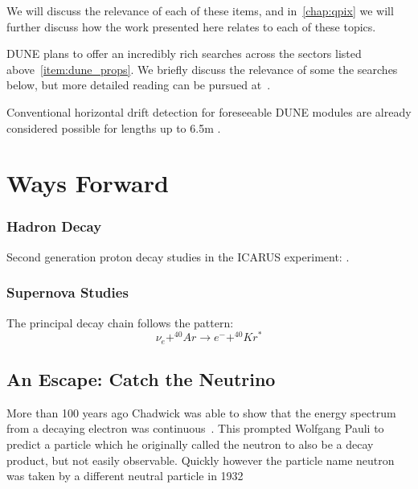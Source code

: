 We will discuss the relevance of each of these items, and in~\ref{chap:qpix} we will further discuss how the work presented here relates to each of these topics.

DUNE plans to offer an incredibly rich searches across the sectors listed above~\ref{item:dune_props}.
We briefly discuss the relevance of some the searches below, but more detailed reading can be pursued at~\citep{DUNE_FD_TDRv2_2020}.

Conventional horizontal drift detection for foreseeable DUNE modules are already considered possible for lengths up to 6.5m \citep{DUNE_Vertical:Paulucci_2022}.


\section{Ways Forward}

\subsubsection{Hadron Decay}
\label{sect:intro_decay}

Second generation proton decay studies in the ICARUS experiment: \citep{ICARUS_2001}.


\subsubsection{Supernova Studies}
\label{sect:intro_supernova}

The principal decay chain follows the pattern:
\begin{equation}
    \nu_{e} + ^{40}Ar \rightarrow e^- + ^{40}Kr^*
\end{equation}

\subsection{An Escape: Catch the Neutrino}

More than 100 years ago Chadwick was able to show that the energy spectrum from a decaying electron was continuous~\citep{Chadwick:1914zz}.
This prompted Wolfgang Pauli to predict a particle which he originally called the neutron to also be a decay product, but not easily observable.
Quickly however the particle name neutron was taken by a different neutral particle in 1932~\citep{Chadwick1932PossibleEO}

